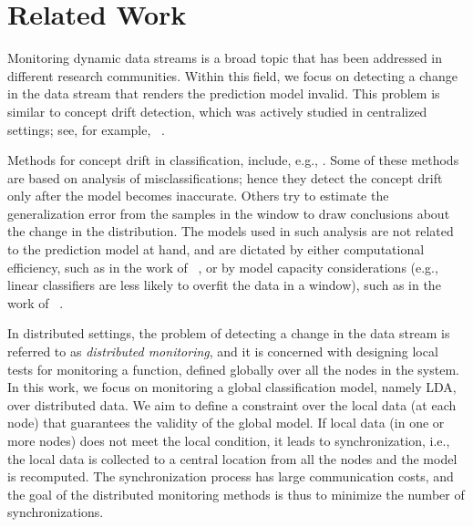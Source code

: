 \section{Related Work}
Monitoring dynamic data streams is a broad topic that has been addressed in different research communities. Within this field, we focus on detecting a change in the data stream that renders the prediction model invalid. This problem is similar to concept drift detection, which was actively studied in centralized settings; see, for example, ~\cite{basseville1993detection,brodsky2013nonparametric,ChenGupta2000,Tsymbal,Gama2014}.

Methods for concept drift in classification, include, e.g., \cite{gama2004learning,baena2006early,klinkenberg2000detecting,dries2009adaptive,icml2014c2_harel14,AngGZPH13}. Some of these methods are based on analysis of misclassifications; hence they detect the concept drift only after the model becomes inaccurate. Others try to estimate the generalization error from the samples in the window to draw conclusions about the change in the distribution. The models used in such analysis are not related to the prediction model at hand, and are dictated by either computational efficiency, such as in the work of ~\cite{klinkenberg2000detecting}, or by model capacity considerations (e.g., linear classifiers are less likely to overfit the data in a window), such as in the work of ~\cite{dries2009adaptive}. 


In distributed settings, the problem of detecting a change in the data stream is referred to as {\em distributed monitoring}, and it is concerned with designing local tests for monitoring a function, defined globally over all the nodes in the system.
In this work, we focus on monitoring a global classification model, namely LDA, over distributed data.
We aim to define a constraint over the local data (at each node) that guarantees the validity of the global model. If local data (in one or more nodes) does not meet the local condition, it leads to synchronization, i.e., the local data is collected to a central location from all the nodes and the model is recomputed.
The synchronization process has large communication costs, and the goal of the distributed monitoring methods is thus to minimize the number of synchronizations.


